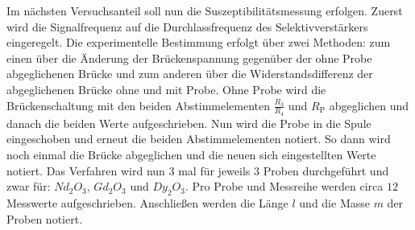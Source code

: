 Im nächsten Versuchsanteil soll nun die Suszeptibilitätsmessung erfolgen. Zuerst wird die Signalfrequenz auf die Durchlassfrequenz des Selektivverstärkers eingeregelt. Die experimentelle Bestimmung erfolgt über zwei Methoden: zum einen über die Änderung der Brückenspannung gegenüber der ohne Probe abgeglichenen Brücke und zum anderen über die Widerstandsdifferenz der abgeglichenen Brücke ohne und mit Probe. Ohne Probe wird die Brückenschaltung mit den beiden Abstimmelementen $\frac{R_3}{R_4}$ und $R_\text{P}$ abgeglichen und danach die beiden Werte aufgeschrieben. Nun wird die Probe in die Spule eingeschoben und erneut die beiden Abstimmelementen notiert. So dann wird noch einmal die Brücke abgeglichen und die neuen sich eingestellten Werte notiert. Das Verfahren wird nun $3$ mal für jeweils $3$ Proben durchgeführt und zwar für: $Nd_2O_3$, $Gd_2O_3$ und $Dy_2O_3$. Pro Probe und Messreihe werden circa $12$ Messwerte aufgeschrieben. Anschließen werden die Länge $l$ und die Masse $m$ der Proben notiert. 